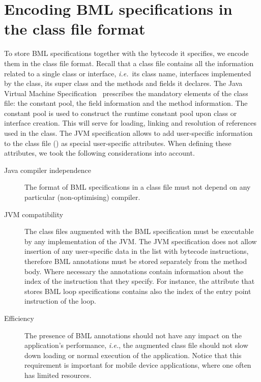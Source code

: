 \section{Encoding BML specifications in the class file format}
\label{SecClassfile}

To store BML specifications together with the bytecode it specifies,
we encode them in the class file format. Recall that a class file
contains all the information related to a single class or interface,
\emph{i.e.}\ its class name, interfaces implemented by the class, its
super class and the methods and fields it declares. The Java Virtual
Machine Specification~\cite{JVMspec} prescribes the mandatory elements
of the class file: the constant pool, the field information and the
method information. The constant pool is used to construct the runtime
constant pool upon class or interface creation. This will serve for
loading, linking and resolution of references used in the class. The
JVM specification allows to add user-specific information to the class
file (\cite[\S4.7.1]{JVMspec}) as special user-specific attributes.
When defining these attributes, we took the following considerations
into account.

\begin{description}
\item [Java compiler independence]
The format of BML specifications in a class file must not depend on
any particular (non-optimising) compiler.
    
      
\item [JVM compatibility]
The class files augmented with the BML specification must be
executable by any implementation of the JVM.  The JVM specification
does not allow insertion of any user-specific data in the list with
bytecode instructions, therefore BML annotations must be stored
separately from the method body. Where necessary the annotations
contain information about the index of the instruction that they
specify. For instance, the attribute that stores BML loop
specifications contains also the index of the entry point instruction
of the loop.

\item[Efficiency]
The presence of BML annotations should not have any impact on the
application's performance, \emph{i.e.}, the augmented class file
should not slow down loading or normal execution of the
application. Notice that this requirement is important for mobile
device applications, where one often has limited resources.
\end{description}	  

